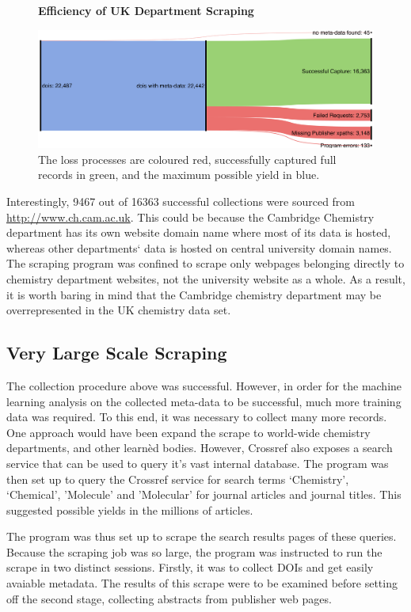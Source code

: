 \begin{figure}[H]
    \centering
    \textbf{Efficiency of UK Department Scraping}\par\medskip
    \includegraphics[scale=0.07]{Data_Acquisition/uk_sankey.png}
    \caption{The loss processes are coloured red, successfully captured full records in green, and the maximum possible yield in blue.}
     \label{fig:UKSANK}
\end{figure}

Interestingly, 9467 out of 16363 successful collections were sourced from \url{http://www.ch.cam.ac.uk}. This could be because the Cambridge Chemistry department has its own website domain name where most of its data is hosted, whereas other departments` data is hosted on central university domain names. The scraping program was confined to scrape only webpages belonging directly to chemistry department websites, not the university website as a whole. As a result, it is worth baring in mind that the Cambridge chemistry department may be overrepresented in the UK chemistry data set.

\subsection{Very Large Scale Scraping}
\label{sec:CROSSREFSCRAPE}
The collection procedure above was successful. However, in order for the machine learning analysis on the collected meta-data to be successful, much more training data was required. To this end, it was necessary to collect many more records. One approach would have been expand the scrape to world-wide chemistry departments, and other learn\`{e}d bodies. However, Crossref also exposes a search service that can be used to query it's vast internal database. The program was then set up to query the Crossref service for search terms `Chemistry', `Chemical', 'Molecule' and 'Molecular' for journal articles and journal titles. This suggested possible yields in the millions of articles. 

The program was thus set up to scrape the search results pages of these queries. Because the scraping job was so large, the program was instructed to run the scrape in two distinct sessions. Firstly, it was to collect DOIs and get easily avaiable metadata. The results of this scrape were to be examined before setting off the second stage, collecting abstracts from publisher web pages. 

